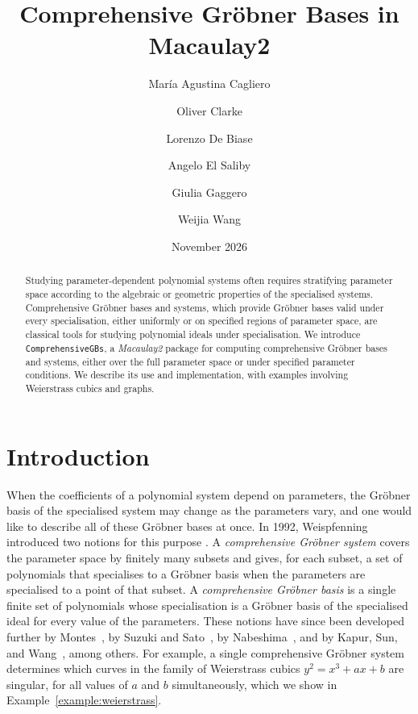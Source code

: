 \documentclass[11pt]{amsart}
\title{Comprehensive Gr\"obner Bases in Macaulay2}
\author{María Agustina Cagliero}
\author{Oliver Clarke}
\author{Lorenzo De Biase}
\author{Angelo El Saliby}
\author{Giulia Gaggero}
\author{Weijia Wang}
\date{November 2026}
\theoremstyle{plain}
\theoremstyle{definition}
\theoremstyle{remark}
\begin{document}
\begin{abstract}
    Studying parameter-dependent polynomial systems often requires stratifying parameter space according to the algebraic or geometric properties of the specialised systems. Comprehensive Gröbner bases and systems, which provide Gröbner bases valid under every specialisation, either uniformly or on specified regions of parameter space, are classical tools for studying polynomial ideals under specialisation. We introduce \texttt{ComprehensiveGBs}, a \emph{Macaulay2} package for computing comprehensive Gröbner bases and systems, either over the full parameter space or under specified parameter conditions. We describe its use and implementation, with examples involving Weierstrass cubics and graphs.
\end{abstract}


\maketitle
{}


\section{Introduction}
When the coefficients of a polynomial system depend on parameters, the Gr\"obner basis of the specialised system may change as the parameters vary,
and one would like to describe all of these Gröbner bases at once.
In 1992, Weispfenning introduced two notions for this purpose \cite{WEISPFENNING19921}.
A \emph{comprehensive Gr\"obner system} covers the parameter space by finitely many subsets and gives, for each subset, a set of polynomials that specialises to a Gr\"obner basis when the parameters are specialised to a point of that subset.
A \emph{comprehensive Gr\"obner basis} is a single finite set of polynomials whose specialisation is a Gr\"obner basis of the specialised ideal for every value of the parameters.
These notions have since been developed further by Montes~\cite{MONTES2002183},
by Suzuki and Sato~\cite{SS}, by Nabeshima~\cite{Nabeshima},
and by Kapur, Sun, and Wang~\cite{KAPUR201327}, among others.
For example, a single comprehensive Gröbner system determines which curves in the family of Weierstrass cubics $y^2=x^3+ax+b$ are singular, for all values of $a$ and $b$ simultaneously,
which we show in Example~\ref{example:weierstrass}.
\end{document}
